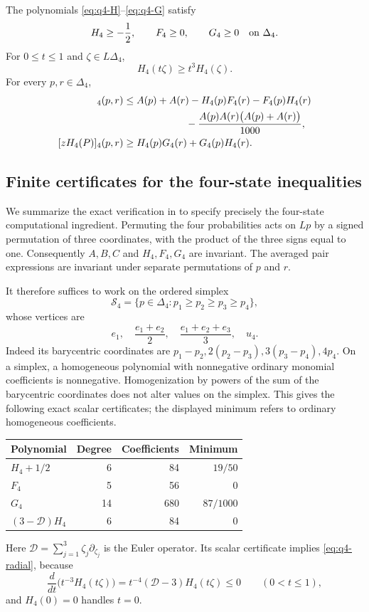 \begin{proposition}
\label{prop:q4-imported-pair}
The polynomials \eqref{eq:q4-H}--\eqref{eq:q4-G} satisfy
\[
 H_4\ge-\frac12,\qquad F_4\ge0,\qquad G_4\ge0
 \quad\hbox{on }\Delta_4.
\]
For $0\le t\le1$ and $\zeta\in L\Delta_4$,
\begin{equation}
 H_4(t\zeta)\ge t^3H_4(\zeta).
 \label{eq:q4-radial}
\end{equation}
For every $p,r\in\Delta_4$,
\begin{align}
 [zA(P)]_4(p,r)
 &\le A(p)+A(r)-H_4(p)F_4(r)-F_4(p)H_4(r)\notag\\
 &\hspace{22mm}
 -\frac{A(p)A(r)\bigl(A(p)+A(r)\bigr)}{1000},
 \label{eq:q4-pair-A}\\
 [zH_4(P)]_4(p,r)
 &\ge H_4(p)G_4(r)+G_4(p)H_4(r).
 \label{eq:q4-pair-H}
\end{align}
\end{proposition}

\subsection{Finite certificates for the four-state inequalities}
\label{subsec:q4-certificate}

We summarize the exact verification in \cite{OpenAI4} to specify precisely
the four-state computational ingredient.  Permuting the four probabilities
acts on $Lp$ by a signed permutation of three coordinates, with the product
of the three signs equal to one.  Consequently $A,B,C$ and
$H_4,F_4,G_4$ are invariant.  The averaged pair expressions are invariant
under separate permutations of $p$ and $r$.

It therefore suffices to work on the ordered simplex
\[
 \mathcal S_4=\{p\in\Delta_4:p_1\ge p_2\ge p_3\ge p_4\},
\]
whose vertices are
\[
 e_1,\quad \frac{e_1+e_2}{2},\quad
 \frac{e_1+e_2+e_3}{3},\quad u_4.
\]
Indeed its barycentric coordinates are
$p_1-p_2,2(p_2-p_3),3(p_3-p_4),4p_4$.
On a simplex, a homogeneous polynomial with nonnegative ordinary monomial
coefficients is nonnegative.  Homogenization by powers of the sum of the
barycentric coordinates does not alter values on the simplex.  This gives
the following exact scalar certificates; the displayed minimum refers to
ordinary homogeneous coefficients.
\begin{center}
\begin{tabular}{lrrr}
\hline
Polynomial & Degree & Coefficients & Minimum\\
\hline
$H_4+1/2$ & 6 & 84 & $19/50$\\
$F_4$ & 5 & 56 & $0$\\
$G_4$ & 14 & 680 & $87/1000$\\
$(3-\mathcal D)H_4$ & 6 & 84 & $0$\\
\hline
\end{tabular}
\end{center}
Here $\mathcal D=\sum_{j=1}^3\zeta_j\partial_{\zeta_j}$ is the Euler
operator.  Its scalar certificate implies \eqref{eq:q4-radial}, because
\[
 \frac{d}{dt}\bigl(t^{-3}H_4(t\zeta)\bigr)
 =t^{-4}(\mathcal D-3)H_4(t\zeta)\le0
 \qquad(0<t\le1),
\]
and $H_4(0)=0$ handles $t=0$.

